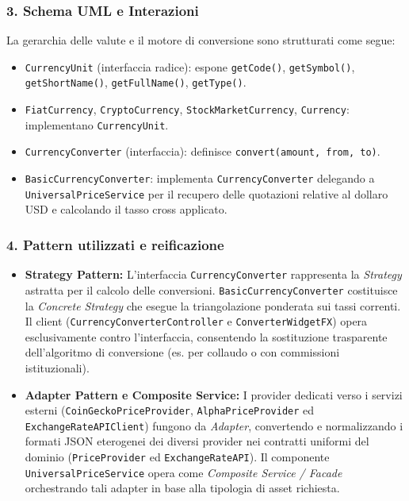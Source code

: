 \documentclass[11pt,a4paper,openright]{report}
\begin{document}
\subsubsection*{3. Schema UML e Interazioni}
La gerarchia delle valute e il motore di conversione sono strutturati come segue:
\begin{itemize}
  \item \texttt{CurrencyUnit} (interfaccia radice): espone \texttt{getCode()}, \texttt{getSymbol()}, \texttt{getShortName()}, \texttt{getFullName()}, \texttt{getType()}.
  \item \texttt{FiatCurrency}, \texttt{CryptoCurrency}, \texttt{StockMarketCurrency}, \texttt{Currency}: implementano \texttt{CurrencyUnit}.
  \item \texttt{CurrencyConverter} (interfaccia): definisce \texttt{convert(amount, from, to)}.
  \item \texttt{BasicCurrencyConverter}: implementa \texttt{CurrencyConverter} delegando a \texttt{UniversalPriceService} per il recupero delle quotazioni relative al dollaro USD e calcolando il tasso cross applicato.
\end{itemize}

\subsubsection*{4. Pattern utilizzati e reificazione}
\begin{itemize}
  \item \textbf{Strategy Pattern:} L'interfaccia \texttt{CurrencyConverter} rappresenta la \emph{Strategy} astratta per il calcolo delle conversioni. \texttt{BasicCurrencyConverter} costituisce la \emph{Concrete Strategy} che esegue la triangolazione ponderata sui tassi correnti. Il client (\texttt{CurrencyConverterController} e \texttt{ConverterWidgetFX}) opera esclusivamente contro l'interfaccia, consentendo la sostituzione trasparente dell'algoritmo di conversione (es. per collaudo o con commissioni istituzionali).
  \item \textbf{Adapter Pattern e Composite Service:} I provider dedicati verso i servizi esterni (\texttt{CoinGeckoPriceProvider}, \texttt{AlphaPriceProvider} ed \texttt{ExchangeRateAPIClient}) fungono da \emph{Adapter}, convertendo e normalizzando i formati JSON eterogenei dei diversi provider nei contratti uniformi del dominio (\texttt{PriceProvider} ed \texttt{ExchangeRateAPI}). Il componente \texttt{UniversalPriceService} opera come \emph{Composite Service / Facade} orchestrando tali adapter in base alla tipologia di asset richiesta.
\end{itemize}
\end{document}
